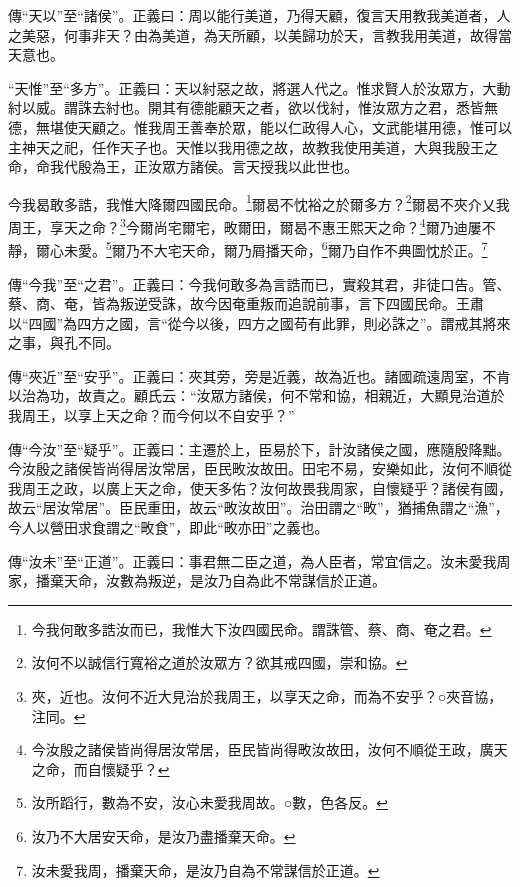{\noindent\zhuan{}\fzbyks 傳“天以”至“諸侯”。正義曰：周以能行美道，乃得天顧，復言天用教我美道者，人之美惡，何事非天？由為美道，為天所顧，以美歸功於天，言教我用美道，故得當天意也。 \par}

{\noindent\shu{}\fzkt “天惟”至“多方”。正義曰：天以紂惡之故，將選人代之。惟求賢人於汝眾方，大動紂以威。謂誅去紂也。開其有德能顧天之者，欲以伐紂，惟汝眾方之君，悉皆無德，無堪使天顧之。惟我周王善奉於眾，能以仁政得人心，文武能堪用德，惟可以主神天之祀，任作天子也。天惟以我用德之故，故教我使用美道，大與我殷王之命，命我代殷為王，正汝眾方諸侯。言天授我以此世也。 \par}

今我曷敢多誥，我惟大降爾四國民命。\footnote{今我何敢多誥汝而已，我惟大下汝四國民命。謂誅管、蔡、商、奄之君。}爾曷不忱裕之於爾多方？\footnote{汝何不以誠信行寬裕之道於汝眾方？欲其戒四國，崇和協。}爾曷不夾介乂我周王，享天之命？\footnote{夾，近也。汝何不近大見治於我周王，以享天之命，而為不安乎？○夾音協，注同。}今爾尚宅爾宅，畋爾田，爾曷不惠王熙天之命？\footnote{今汝殷之諸侯皆尚得居汝常居，臣民皆尚得畋汝故田，汝何不順從王政，廣天之命，而自懷疑乎？}爾乃迪屢不靜，爾心未愛。\footnote{汝所蹈行，數為不安，汝心未愛我周故。○數，色各反。}爾乃不大宅天命，爾乃屑播天命，\footnote{汝乃不大居安天命，是汝乃盡播棄天命。}爾乃自作不典圖忱於正。\footnote{汝未愛我周，播棄天命，是汝乃自為不常謀信於正道。}


{\noindent\zhuan{}\fzbyks 傳“今我”至“之君”。正義曰：今我何敢多為言誥而已，實殺其君，非徒口告。管、蔡、商、奄，皆為叛逆受誅，故今因奄重叛而追說前事，言下四國民命。王肅以“四國”為四方之國，言“從今以後，四方之國苟有此罪，則必誅之”。謂戒其將來之事，與孔不同。 \par}

{\noindent\zhuan{}\fzbyks 傳“夾近”至“安乎”。正義曰：夾其旁，旁是近義，故為近也。諸國疏遠周室，不肯以治為功，故責之。顧氏云：“汝眾方諸侯，何不常和協，相親近，大顯見治道於我周王，以享上天之命？而今何以不自安乎？” \par}

{\noindent\zhuan{}\fzbyks 傳“今汝”至“疑乎”。正義曰：主遷於上，臣易於下，計汝諸侯之國，應隨殷降黜。今汝殷之諸侯皆尚得居汝常居，臣民畋汝故田。田宅不易，安樂如此，汝何不順從我周王之政，以廣上天之命，使天多佑？汝何故畏我周家，自懷疑乎？諸侯有國，故云“居汝常居”。臣民重田，故云“畋汝故田”。治田謂之“畋”，猶捕魚謂之“漁”，今人以營田求食謂之“畋食”，即此“畋亦田”之義也。 \par}

{\noindent\zhuan{}\fzbyks 傳“汝未”至“正道”。正義曰：事君無二臣之道，為人臣者，常宜信之。汝未愛我周家，播棄天命，汝數為叛逆，是汝乃自為此不常謀信於正道。 \par}

